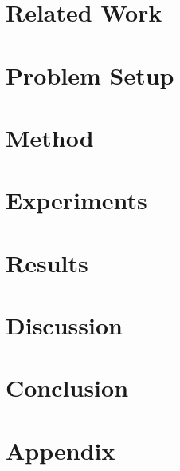 \documentclass{article}
\newif\ificml
\begin{document}
\section{Related Work}


\section{Problem Setup}


\section{Method}


\section{Experiments}


\section{Results}


\section{Discussion}


\section{Conclusion}


\appendix
\section{Appendix}


\ificml
  \IfFileExists{icml2026.bst}{}{}
\else
  
\fi

\end{document}
